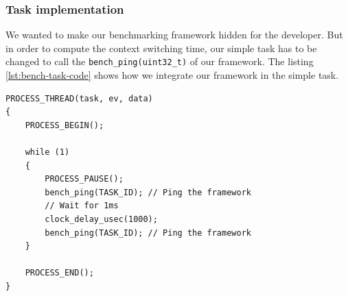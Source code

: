 \subsubsection{Task implementation}

We wanted to make our benchmarking framework hidden for the developer.
But in order to compute the context switching time, our simple task has to be changed to call the \texttt{bench\_ping(uint32\_t)} of our framework.
The listing \ref{lst:bench-task-code} shows how we integrate our framework in the simple task.

\begin{lstlisting}[float, style=CStyle, label={lst:bench-task-code}, caption={Source code of the task with benchmarking framework calls}]
PROCESS_THREAD(task, ev, data)
{
    PROCESS_BEGIN();

    while (1)
    {
        PROCESS_PAUSE();
        bench_ping(TASK_ID); // Ping the framework
        // Wait for 1ms
        clock_delay_usec(1000);
        bench_ping(TASK_ID); // Ping the framework
    }

    PROCESS_END();
}
\end{lstlisting}